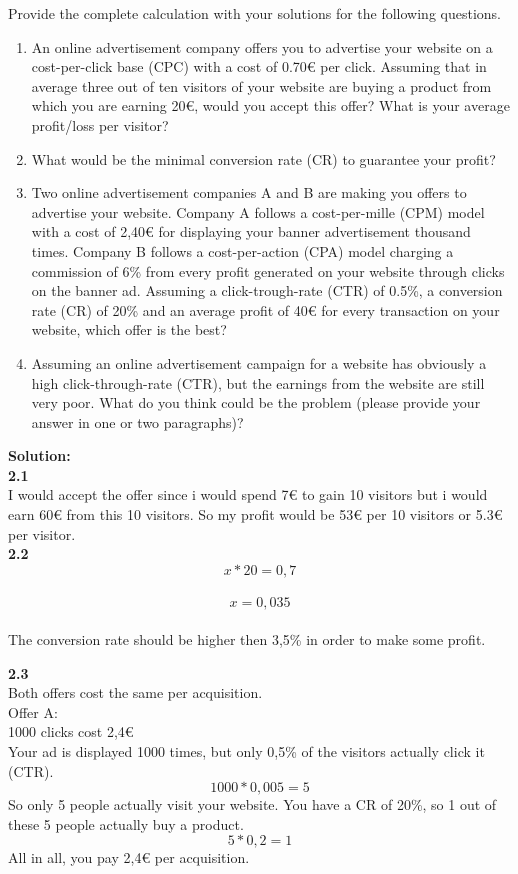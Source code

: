 \documentclass{WeSTassignment}
\begin{document}
Provide the complete calculation with your solutions for the following questions.
\begin {enumerate}
\item An online advertisement company offers you to advertise your website on a
cost-per-click base (CPC) with a cost of 0.70€ per click. Assuming that in
average three out of ten visitors of your website are buying a product from which you are earning
20€, would you accept this offer? What is your average profit/loss per visitor?
\item What would be the minimal conversion rate (CR) to guarantee your profit? 
\item Two   online   advertisement   companies  A  and   B   are   making   you   offers   to
advertise your website. Company A follows a cost-per-mille (CPM) model with a
cost of 2,40€ for displaying your banner advertisement thousand times. Company B follows a cost-per-action (CPA) model charging a commission of 6\% from every profit generated on your website
through clicks on the banner ad. Assuming a click-trough-rate (CTR) of 0.5\%, a conversion rate (CR) of 20\% and an average profit of 40€ for every transaction on your website, which offer is the best? 
\item Assuming an online advertisement campaign for a website has obviously a high
click-through-rate (CTR), but the earnings from the website are still very poor.
What do you think could be the problem (please provide your answer in one or two paragraphs)?

\end{enumerate}

\textbf{Solution:}\\
\textbf{2.1}\\
I would accept the offer since i would spend 7€ to gain 10 visitors but i would earn 60€ from this 10 visitors. So my profit would be 53€ per 10 visitors or 5.3€ per visitor. \\

\textbf{2.2}\\
$$x * 20 = 0,7$$ \\
$$x = 0,035$$ \\
The conversion rate should be higher then 3,5\% in order to make some profit. 

\textbf{2.3}\\
Both offers cost the same per acquisition. \\

Offer A:\\
1000 clicks cost 2,4€\\
Your ad is displayed 1000 times, but only 0,5\% of the visitors actually click it (CTR).
$$1000 * 0,005 = 5$$ So only 5 people actually visit your website. You have a CR of 20\%, so 1 out of these 5 people actually buy a product. 
$$5 * 0,2 = 1$$
All in all, you pay 2,4€ per acquisition.
\end{document}
